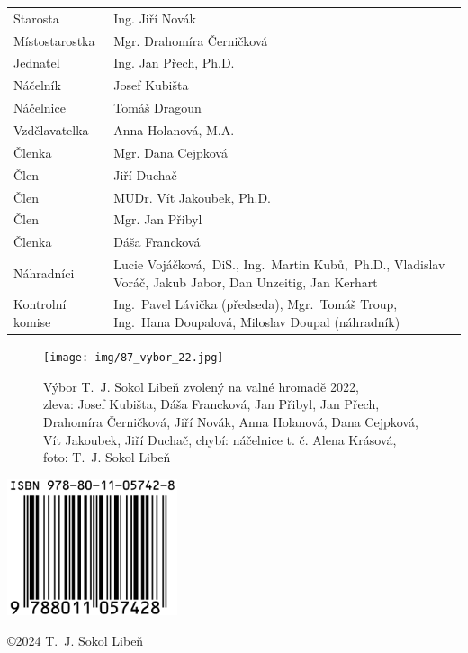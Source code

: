 \documentclass[a5paper, 11pt, twoside]{article}
\begin{document}
\begin{tabular}{l >{\raggedright\arraybackslash}p{8.5cm}}
  Starosta & Ing. Jiří Novák \\
  Místostarostka & Mgr. Drahomíra Černičková \\
  Jednatel & Ing. Jan Přech, Ph.D. \\
  Náčelník & Josef Kubišta \\
  Náčelnice & Tomáš Dragoun \\
  Vzdělavatelka & Anna Holanová, M.A. \\
  Členka & Mgr. Dana Cejpková \\
  Člen & Jiří Duchač \\
  Člen & MUDr. Vít Jakoubek, Ph.D. \\
  Člen & Mgr. Jan Přibyl \\
  Členka & Dáša Francková \\
  Náhradníci & Lucie Vojáčková,~DiS., Ing.~Martin Kubů,~Ph.D., Vladislav Voráč, Jakub Jabor, Dan Unzeitig, Jan Kerhart \\
  Kontrolní komise & Ing.~Pavel Lávička (předseda), Mgr.~Tomáš Troup, Ing.~Hana Doupalová, Miloslav Doupal (náhradník) \\
\end{tabular}

\begin{figure}[t]
  \centering
  \texttt{[image: img/87\_vybor\_22.jpg]}
  \caption*{Výbor T.~J. Sokol Libeň zvolený na valné hromadě 2022,\\zleva:
  Josef Kubišta, Dáša Francková, Jan Přibyl, Jan Přech, Drahomíra
  Černičková, Jiří Novák, Anna Holanová, Dana Cejpková, Vít Jakoubek, Jiří
  Duchač, chybí: náčelnice t. č. Alena Krásová, foto: T.~J. Sokol Libeň}
\end{figure}


\clearpage
{}
\null
\clearpage
\null
\clearpage


\setlength{\oddsidemargin}{-10mm}
\pagecolor{sokolred}
\color{white}
\centering
\null
\vspace{\fill}

\includegraphics[width=5cm]{img/88_isbn.png}

\vspace*{11pt}
\copyright 2024 T.~J. Sokol Libeň
\vspace{2cm}
\end{document}
